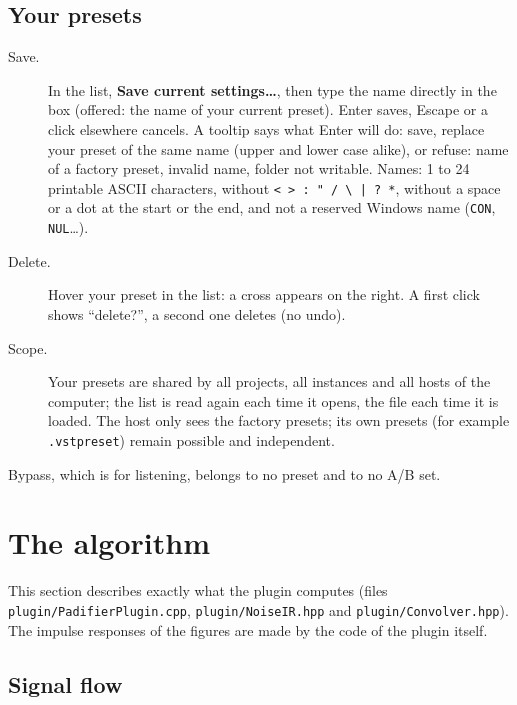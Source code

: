 \documentclass[a4paper,11pt]{article}
\newcommand{\ctl}[1]{\textsf{\textbf{#1}}}   %
\begin{document}
\subsection{Your presets}
\begin{description}
\item[Save.] In the list, \ctl{Save current settings\ldots}, then type the name directly in the
  box (offered: the name of your current preset). \textsf{Enter} saves, \textsf{Escape} or a click
  elsewhere cancels. A tooltip says what \textsf{Enter} will do: save, replace your preset of the
  same name (upper and lower case alike), or refuse: name of a factory preset, invalid name, folder
  not writable. Names: 1 to 24 printable ASCII characters, without \verb+< > : " / \ | ? *+,
  without a space or a dot at the start or the end, and not a reserved Windows name (\texttt{CON},
  \texttt{NUL}\ldots).
\item[Delete.] Hover your preset in the list: a cross appears on the right. A first click shows
  ``delete?'', a second one deletes (no undo).
\item[Scope.] Your presets are shared by all projects, all instances and all hosts of the
  computer; the list is read again each time it opens, the file each time it is loaded. The host
  only sees the factory presets; its own presets (for example \texttt{.vstpreset}) remain possible
  and independent.
\end{description}
Bypass, which is for listening, belongs to no preset and to no A/B set.

\section{The algorithm}

This section describes exactly what the plugin computes (files
\nolinkurl{plugin/PadifierPlugin.cpp}, \nolinkurl{plugin/NoiseIR.hpp} and
\nolinkurl{plugin/Convolver.hpp}). The impulse responses of the figures are made by the code of
the plugin itself.

\subsection{Signal flow}
\end{document}
